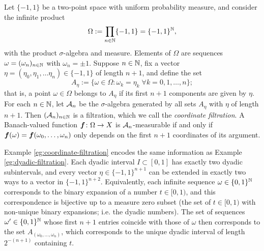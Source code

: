 \begin{example}\label{eg:coordinate-filtration}
  Let $\{-1,1\}$ be a two-point space with uniform probability measure, and consider the infinite product
  \begin{equation*}
    \Omega := \prod_{n \in \mathbb{N}} \{-1,1\} = \{-1,1\}^{\mathbb{N}},
  \end{equation*}
  with the product $\sigma$-algebra and measure.
  Elements of $\Omega$ are sequences $\omega = (\omega_n)_{n \in \mathbb{N}}$ with $\omega_n = \pm 1$.
  Suppose $n \in \mathbb{N}$, fix a vector $\eta = (\eta_0, \eta_1, \ldots \eta_n) \in \{-1,1\}$ of length $n+1$, and define the set
  \begin{equation*}
    A_{\eta} := \{\omega \in \Omega : \omega_k = \eta_k \; \forall k = 0,1,\ldots,n\};
  \end{equation*}
  that is, a point $\omega \in \Omega$ belongs to $A_{\eta}$ if its first $n+1$ components are given by $\eta$.
  For each $n \in \mathbb{N}$, let $\mathcal{A}_n$ be the $\sigma$-algebra generated by all sets $A_{\eta}$ with $\eta$ of length $n+1$.
  Then $(\mathcal{A}_n)_{n \in \mathbb{N}}$ is a filtration, which we call the \emph{coordinate filtration}.
  A Banach-valued function $\bm{f} \colon \Omega \rightarrow X$ is $\mathcal{A}_n$-measurable if and only if $\bm{f}(\omega) = \bm{f}(\omega_0,\ldots,\omega_n)$ only depends on the first $n+1$ coordinates of its argument.
\end{example}

\begin{rmk}
  Example \ref{eg:coordinate-filtration} encodes the same information as Example \ref{eg:dyadic-filtration}.
  Each dyadic interval $I \subset [0,1]$ has exactly two dyadic subintervals, and every vector $\eta \in \{-1,1\}^{n+1}$ can be extended in exactly two ways to a vector in $\{-1,1\}^{n+2}$.
  Equivalently, each infinite sequence $\omega \in \{0,1\}^{\mathbb{N}}$ corresponds to the binary expansion of a number $t \in [0,1)$, and this correspondence is bijective up to a measure zero subset (the set of $t \in [0,1)$ with non-unique binary expansions; i.e. the dyadic numbers).
  The set of sequences $\omega' \in \{0,1\}^{\mathbb{N}}$ whose first $n+1$ entries coincide with those of $\omega$ then corresponds to the set $A_{(\omega_0,\ldots,\omega_n)}$, which corresponds to the unique dyadic interval of length $2^{-(n+1)}$ containing $t$. 
\end{rmk}


